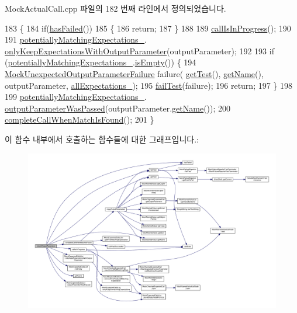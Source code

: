 Mock\+Actual\+Call.\+cpp 파일의 182 번째 라인에서 정의되었습니다.


\begin{DoxyCode}
183 \{
184     \textcolor{keywordflow}{if}(\hyperlink{class_mock_checked_actual_call_ae4deec08ed507f9a2f1cced854fc5a16}{hasFailed}())
185     \{
186         \textcolor{keywordflow}{return};
187     \}
188 
189     \hyperlink{class_mock_checked_actual_call_a60fd1e06699e3f79444c4e7f8055ac4a}{callIsInProgress}();
190 
191     \hyperlink{class_mock_checked_actual_call_a4fc6bec7509ed6eb28096956758c030a}{potentiallyMatchingExpectations\_}.
      \hyperlink{class_mock_expected_calls_list_a972b3fc801d32ecaf8039bd3206bb58e}{onlyKeepExpectationsWithOutputParameter}(outputParameter);
192 
193     \textcolor{keywordflow}{if} (\hyperlink{class_mock_checked_actual_call_a4fc6bec7509ed6eb28096956758c030a}{potentiallyMatchingExpectations\_}.\hyperlink{class_mock_expected_calls_list_a479432127ee77145cc19d6a2d1590821}{isEmpty}()) \{
194         \hyperlink{class_mock_unexpected_output_parameter_failure}{MockUnexpectedOutputParameterFailure} failure(
      \hyperlink{class_mock_checked_actual_call_aa10112b41f7ed20162b12633042bb775}{getTest}(), \hyperlink{class_mock_checked_actual_call_ab9fb89f09ab681191e4eaa9221b42491}{getName}(), outputParameter, \hyperlink{class_mock_checked_actual_call_aed217603c4a32c8f55a3087ac4a64a78}{allExpectations\_});
195         \hyperlink{class_mock_checked_actual_call_a275e824525aa26cb8874437442cdc186}{failTest}(failure);
196         \textcolor{keywordflow}{return};
197     \}
198 
199     \hyperlink{class_mock_checked_actual_call_a4fc6bec7509ed6eb28096956758c030a}{potentiallyMatchingExpectations\_}.
      \hyperlink{class_mock_expected_calls_list_ac2fed7fbbb6573c72c6bba4edcee4701}{outputParameterWasPassed}(outputParameter.\hyperlink{class_mock_named_value_ab9fb89f09ab681191e4eaa9221b42491}{getName}());
200     \hyperlink{class_mock_checked_actual_call_aae5ca9ab18e1a3a03ab292e825e2ece6}{completeCallWhenMatchIsFound}();
201 \}
\end{DoxyCode}


이 함수 내부에서 호출하는 함수들에 대한 그래프입니다.\+:
\nopagebreak
\begin{figure}[H]
\begin{center}
\leavevmode
\includegraphics[width=350pt]{class_mock_checked_actual_call_ae5bb17583112fdf624ab592bf40d39c1_cgraph}
\end{center}
\end{figure}




